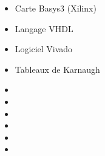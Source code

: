 \documentclass{article}
\begin{document}
\begin{tabular}
\begin{itemize}
\begin{itemize}
            \item \textcolor{gray!100}{Carte Basys3 (Xilinx)}
            \item \textcolor{gray!100}{Langage VHDL}
            \item \textcolor{gray!100}{Logiciel Vivado}
            \item \textcolor{gray!100}{Tableaux de Karnaugh}
            \item[\textcolor{white}{}] {} %
            \item[\textcolor{white}{}] {} %
            \item[\textcolor{white}{}] {} %
            \item[\textcolor{white}{}] {} %
            \item[\textcolor{white}{}] {} %
            \item[\textcolor{white}{}] {} %

        \end{itemize}
    \end{itemize}
\end{tabular}

\vfill %


\newpage
\thispagestyle{student_lab_work_ENSEA}

\vspace*{2cm}

\end{document}

